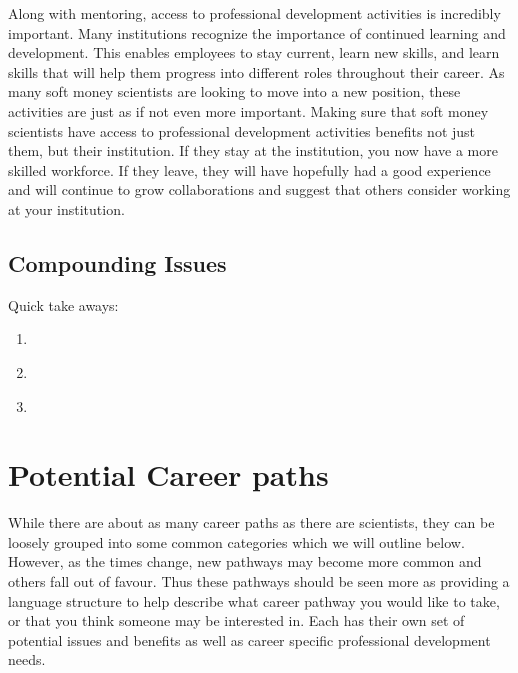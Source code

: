 \documentclass[letterpaper, 12pt]{article}
\begin{document}
Along with mentoring, access to professional development activities is incredibly important. Many institutions recognize the importance of continued learning and development. This enables employees to stay current, learn new skills, and learn skills that will help them progress into different roles throughout their career. As many soft money scientists are looking to move into a new position, these activities are just as if not even more important. Making sure that soft money scientists have access to professional development activities benefits not just them, but their institution. If they stay at the institution, you now have a more skilled workforce. If they leave, they will have hopefully had a good experience and will continue to grow collaborations and suggest that others consider working at your institution.  

\subsection{Compounding Issues}
\begin{tcolorbox}[enhanced,width=\textwidth,center upper,
    fontupper=\bfseries,sharp corners, colback=CASIIlightgrey, colframe=CASIIdarkgreen]
\textcolor{CASIIorange}{Quick take aways:}
\begin{enumerate}
    \item \textcolor{CASIIdarkindago}{}
    \item \textcolor{CASIIdarkindago}{}
    \item \textcolor{CASIIdarkindago}{}

\end{enumerate}
\end{tcolorbox}


\section{Potential Career paths}
 While there are about as many career paths as there are scientists, they can be loosely grouped into some common categories which we will outline below. However, as the times change, new pathways may become more common and others fall out of favour. Thus these pathways should be seen more as providing a language structure to help describe what career pathway you would like to take, or that you think someone may be interested in. Each has their own set of potential issues and benefits as well as career specific professional development needs. 
\end{document}
